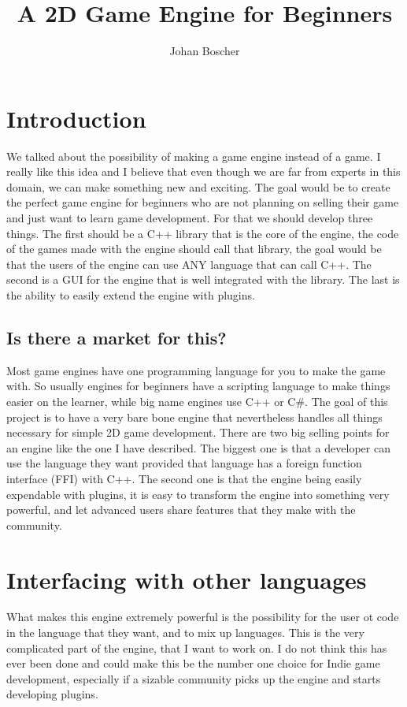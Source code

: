 \documentclass{article}
\begin{document}
	\title{A 2D Game Engine for Beginners}
	\author{Johan Boscher}
	\maketitle
	\tableofcontents
	\newpage
	\section{Introduction}
	We talked about the possibility of making a game engine instead of a game. I really like this idea and I believe that even though we are far from experts in this domain, we can make something new and exciting. The goal would be to create the perfect game engine for beginners who are not planning on selling their game and just want to learn game development. For that we should develop three things. The first should be a C++ library that is the core of the engine, the code of the games made with the engine should call that library, the goal would be that the users of the engine can use ANY language that can call C++. The second is a GUI for the engine that is well integrated with the library. The last is the ability to easily extend the engine with plugins.
	\subsection{Is there a market for this?}
	Most game engines have one programming language for you to make the game with. So usually engines for beginners have a scripting language to make things easier on the learner, while big name engines use C++ or C\#. The goal of this project is to have a very bare bone engine that nevertheless handles all things necessary for simple 2D game development. There are two big selling points for an engine like the one I have described. The biggest one is that a developer can use the language they want provided that language has a foreign function interface (FFI) with C++. The second one is that the engine being easily expendable with plugins, it is easy to transform the engine into something very powerful, and let advanced users share features that they make with the community.
	\section{Interfacing with other languages}
	What makes this engine extremely powerful is the possibility for the user ot code in the language that they want, and to mix up languages. This is the very complicated part of the engine, that I want to work on. I do not think this has ever been done and could make this be the number one choice for Indie game development, especially if a sizable community picks up the engine and starts developing plugins.
\end{document}
